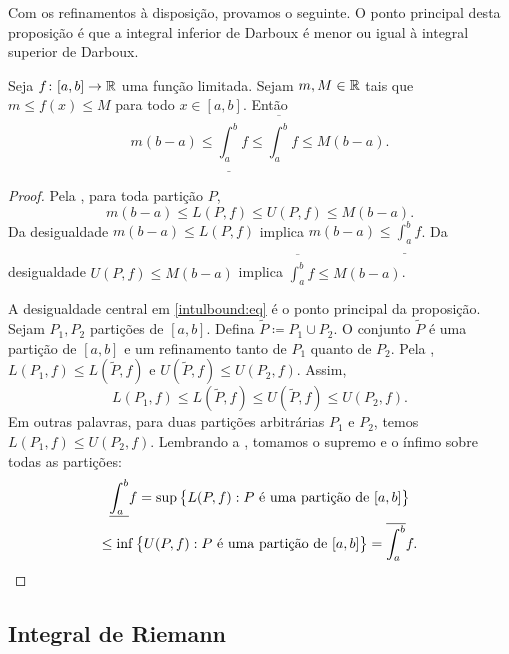 Com os refinamentos à disposição, provamos o seguinte.
O ponto principal desta proposição é que a integral inferior de Darboux é
menor ou igual à integral superior de Darboux.

\begin{prop} \label{intulbound:prop}
Seja $f \colon [a,b] \to {\mathbb{R}}$ uma função limitada. Sejam $m, M \in {\mathbb{R}}$
tais que $m \leq f(x) \leq M$ para todo $x \in [a,b]$. Então
\begin{equation}
\label{intulbound:eq}
m(b-a) \leq
\underline{\int_a^b} f \leq \overline{\int_a^b} f
\leq M(b-a) .
\end{equation}
\end{prop}

\begin{proof}
Pela , para toda partição $P$,
\begin{equation*}
m(b-a) \leq L(P,f) \leq U(P,f) \leq M(b-a).
\end{equation*}
Da desigualdade
$m(b-a) \leq L(P,f)$ implica $m(b-a) \leq \underline{\int_a^b} f$.
Da desigualdade
$U(P,f) \leq M(b-a)$ implica $\overline{\int_a^b} f \leq M(b-a)$.

A desigualdade central em
\eqref{intulbound:eq} é o ponto principal da proposição.
Sejam $P_1, P_2$ partições de $[a,b]$. Defina
$\widetilde{P} \coloneqq P_1 \cup P_2$.
O conjunto $\widetilde{P}$ é uma partição de $[a,b]$ e um refinamento
tanto de $P_1$ quanto de $P_2$.
Pela ,
$L(P_1,f) \leq L(\widetilde{P},f)$ e
$U(\widetilde{P},f) \leq U(P_2,f)$. Assim,
\begin{equation*}
L(P_1,f) \leq L(\widetilde{P},f) \leq U(\widetilde{P},f) \leq U(P_2,f) .
\end{equation*}
Em outras palavras, para duas partições arbitrárias $P_1$ e $P_2$, temos
$L(P_1,f) \leq U(P_2,f)$.
Lembrando a , tomamos o supremo e o ínfimo sobre
todas as partições:
\begin{multline*}
\underline{\int_a^b} f = 
\sup \, \bigl\{ L(P,f) : P \text{ é uma partição de } [a,b] \bigr\}
\\
\leq
\inf \, \bigl\{ U(P,f) : P \text{ é uma partição de } [a,b] \bigr\}
=
\overline{\int_a^b} f . \qedhere
\end{multline*}
\end{proof}

\subsection{Integral de Riemann}


